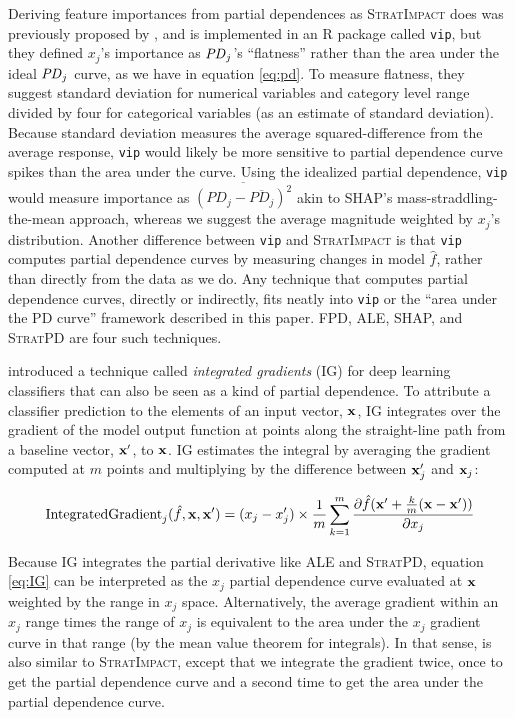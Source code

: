 \documentclass[smallextended]{svjour3}       %
\newcommand{\simp}{\fontfamily{cmr}\textsc{\small StratImpact}}
\newcommand{\spd}{\fontfamily{cmr}\textsc{\small StratPD}}
\begin{document}
Deriving feature importances from partial dependences as \simp{} does was previously proposed by \cite{pdvim}, and is implemented in an R package called {\tt vip}, but they defined $x_j$'s importance as ${\it PD}_j$'s ``flatness'' rather than the area under the ideal ${\it PD}_j$ curve, as we have in equation \eqref{eq:pd}.  To measure flatness, they suggest standard deviation for numerical variables and category level range divided by four for categorical variables (as an estimate of standard deviation).  Because standard deviation measures the average squared-difference from the average response, {\tt vip} would likely be more sensitive to partial dependence curve spikes than the area under the curve.  Using the idealized partial dependence, {\tt vip} would measure importance as $\overline{(PD_j - \overline{PD_j})^2}$ akin to SHAP's mass-straddling-the-mean approach, whereas we suggest the average magnitude weighted by $x_j$'s distribution.  Another difference between {\tt vip} and \simp{} is that {\tt vip} computes partial dependence curves by measuring changes in model $\hat{f}$, rather than directly from the data as we do. Any technique that computes partial dependence curves, directly or indirectly, fits neatly into {\tt vip} or the ``area under the PD curve'' framework described in this paper. FPD, ALE, SHAP, and \spd{} are four such techniques.

\citet{intgrad} introduced a technique called {\em integrated gradients} (IG) for deep learning classifiers that can also be seen as a kind of partial dependence. To attribute a classifier prediction to the elements of an input vector, $\bf x$, IG integrates over the gradient of the model output function at points along the straight-line path from a baseline vector, $\bf x'$, to $\bf x$. IG estimates the integral by averaging the gradient computed at $m$ points and multiplying by the difference between ${\bf x}'_j$ and ${\bf x}_j$:

\begin{equation}\label{eq:IG}
\text{IntegratedGradient}_j(\hat{f}, {\bf x},{\bf x'}) = (x_j - x'_j) \times \frac{1}{m} \sum_{k=1}^{m} \frac{\partial \hat{f}({\bf x}' + \frac{k}{m}({\bf x}-{\bf x}'))}{\partial x_j}
\end{equation}

\noindent  Because IG integrates the partial derivative like ALE and \spd,  equation \eqref{eq:IG} can be interpreted as the $x_j$ partial dependence curve evaluated at $\bf x$ weighted by the range in $x_j$ space. Alternatively, the average gradient within an $x_j$ range times the range of $x_j$ is equivalent to the area under the $x_j$ gradient curve in that range (by the mean value theorem for integrals). In that sense, \cite{intgrad} is also similar to \simp, except that we integrate the gradient twice, once to get the partial dependence curve and a second time to get the area under the partial dependence curve.
\end{document}
